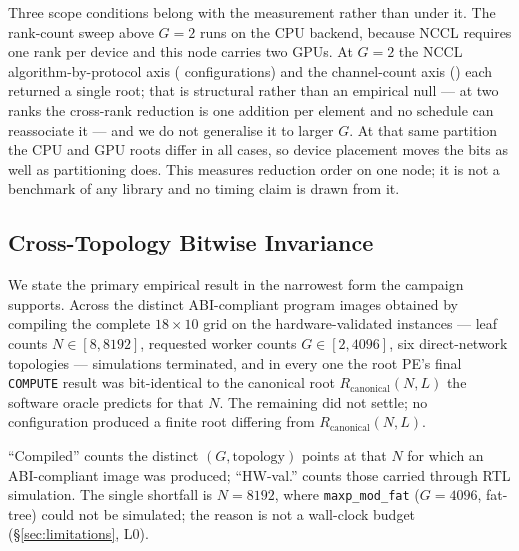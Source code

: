 \documentclass[journal,10pt]{IEEEtran}
\theoremstyle{plain}
\theoremstyle{definition}
\theoremstyle{remark}
\newcommand{\Rcan}{\ensuremath{R_{\mathrm{canonical}}}}
\newcommand{\sprs}{\textsc{SPRS}}
\newcommand{\sv}[1]{\texttt{#1}}
\begin{document}
Three scope conditions belong with the measurement rather than under it. The
rank-count sweep above $G{=}2$ runs on the CPU backend, because NCCL requires
one rank per device and this node carries two GPUs. At $G{=}2$ the NCCL
algorithm-by-protocol axis (\GpuLibCfgs{} configurations) and the
channel-count axis (\GpuChanCfgs{}) each returned a single root; that is
structural rather than an empirical null --- at two ranks the cross-rank
reduction is one addition per element and no schedule can reassociate it ---
and we do not generalise it to larger $G$. At that same partition the CPU and
GPU roots differ in all \GpuCases{} cases, so device placement moves the bits
as well as partitioning does. This measures reduction order on one node; it is
not a benchmark of any library and no timing claim is drawn from it.

\subsection{Cross-Topology Bitwise Invariance}\label{sec:results-invariance}

We state the primary empirical result in the narrowest form the campaign
supports. Across the \InvAttempted{} distinct ABI-compliant program images
obtained by compiling the complete $18\times10$ grid on the \TournNInst{}
hardware-validated instances --- \InvLeafCounts{} leaf counts
$N \in [8,8192]$, requested worker counts $G \in [2,4096]$, six
direct-network topologies --- \WallTBs{} simulations terminated, and in every
one the root PE's final \texttt{COMPUTE} result was bit-identical to the
canonical root $\Rcan(N,L)$ the software oracle predicts for that $N$. The
remaining \InvNonSettling{} did not settle; no configuration produced a finite
root differing from $\Rcan(N,L)$.

\begin{table}[!t]
\caption{Cross-topology bitwise invariance. Each row aggregates all
  HW-validated \sprs{} configurations at the given $N$ over all same-$N$
  $(G,\text{topology})$ pairs and all compiler triples. ``Divergent'' is by
  Claim~\ref{claim:1} expected to be zero. The two mutation columns count
  injected mutants the harness \emph{flagged}; as discussed below, a flag is a
  value mismatch for leaf corruption but usually a fail-stop for address
  substitution, and only the former bears on oracle non-vacuity.}
\label{tab:invariance}
\centering
\footnotesize
\renewcommand{\arraystretch}{1.15}

\vspace{2pt}

\footnotesize
``Compiled'' counts the distinct $(G,\text{topology})$ points at that $N$ for
which an ABI-compliant image was produced; ``HW-val.'' counts those carried
through RTL simulation. The single shortfall is $N{=}8192$, where
\sv{maxp\_mod\_fat} ($G{=}4096$, fat-tree) could not be simulated; the reason
is not a wall-clock budget (\S\ref{sec:limitations}, L0).
\end{table}
\end{document}
